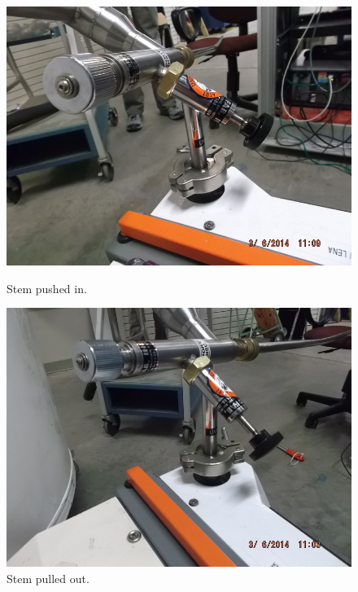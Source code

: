 \begin{figure}[h]
\begin{minipage}{.45\textwidth}
 \label{fig:cf-adapter-on-tl}
 \end{minipage}
 \quad
 \begin{minipage}{.45\textwidth}
 \includegraphics[width=\textwidth]{./img/cf-adapter-pushedin.JPG}
 \caption{Stem pushed in.}
 \label{fig:cf-adapter-pushedin}
 \end{minipage}
 \quad
 \begin{minipage}{.45\textwidth}
  \includegraphics[width=\textwidth]{./img/cf-adapter-pulledout.JPG}
 \caption{Stem pulled out.}
 \label{fig:cf-adapter-pulledout}
 \end{minipage}
 \quad
 \end{figure}


